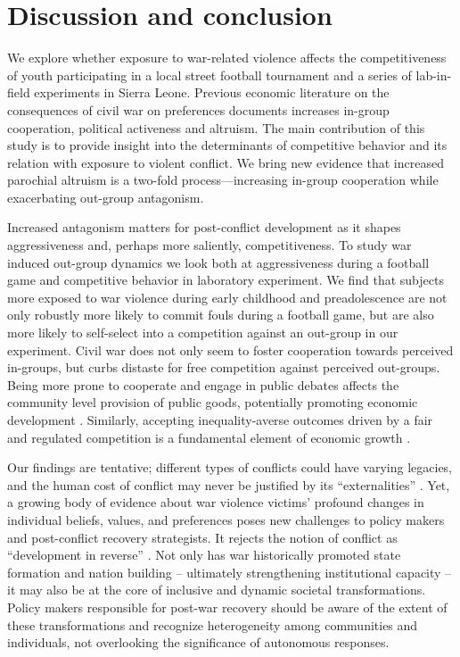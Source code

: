 \section{Discussion and conclusion}
\label{sec:slf:discussion}
We explore whether exposure to war-related violence affects the competitiveness of youth participating in a local street football tournament and a series of lab-in-field experiments in Sierra Leone. Previous economic literature on the consequences of civil war on preferences documents increases in-group cooperation, political activeness and altruism. The main contribution of this study is to provide insight into the determinants of competitive behavior and its relation with exposure to violent conflict. We bring new evidence that increased parochial altruism is a two-fold process—increasing in-group cooperation while exacerbating out-group antagonism. 

Increased antagonism matters for post-conflict development as it shapes aggressiveness and, perhaps more saliently, competitiveness. To study war induced out-group dynamics we look both at aggressiveness during a football game and competitive behavior in laboratory experiment. We find that subjects more exposed to war violence during early childhood and preadolescence are not only robustly more likely to commit fouls during a football game, but are also more likely to self-select into a competition against an out-group in our experiment. Civil war does not only seem to foster cooperation towards perceived in-groups, but curbs distaste for free competition against perceived out-groups. Being more prone to cooperate and engage in public debates affects the community level provision of public goods, potentially promoting economic development \citep{Bellows2009b}. Similarly, accepting inequality-averse outcomes driven by a fair and regulated competition is a fundamental element of economic growth \citep{Bartling2009b}.
 
Our findings are tentative; different types of conflicts could have varying legacies, and the human cost of conflict may never be justified by its ``externalities'' \citep{CassarAlessandra}. Yet, a growing body of evidence about war violence victims’ profound changes in individual beliefs, values, and preferences poses new challenges to policy makers and post-conflict recovery strategists. It rejects the notion of conflict as ``development in reverse'' \cite{Collier2003}. Not only has war historically promoted state formation and nation building – ultimately strengthening institutional capacity \citep{Tilly1975} -- it may also be at the core of inclusive and dynamic societal transformations. Policy makers responsible for post-war recovery should be aware of the extent of these transformations and recognize heterogeneity among communities and individuals, not overlooking the significance of autonomous responses.


